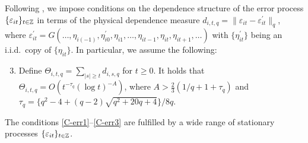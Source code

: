 \documentclass[a4paper,12pt]{article}
\begin{document}
Following \cite{Wu2005}, we impose conditions on the dependence structure of the error process $\{\varepsilon_{it}\}_{t\in\mathbb{Z}}$ in terms of the physical dependence measure $d_{i, t,q} = \| \varepsilon_{it} - \varepsilon_{it}^\prime \|_q$, where $\varepsilon_{it}^\prime = G(\ldots,\eta_{i(-1)},\eta_{i0}^\prime,\eta_{i1},\ldots,\eta_{it-1},\eta_{it},\eta_{it+1},\ldots)$ with $\{\eta_{it}^\prime\}$ being an i.i.d.\ copy of $\{\eta_{it}\}$. In particular, we assume the following: 
\begin{enumerate}[label=(C\arabic*),leftmargin=1.05cm]
\setcounter{enumi}{2}

\item \label{C-err3} Define $\Theta_{i, t,q} = \sum\nolimits_{|s| \ge t} d_{i, s,q}$ for $t \ge 0$. It holds that 
$\Theta_{i, t,q} = O ( t^{-\tau_q} (\log t)^{-A} )$,  
where $A > \frac{2}{3} (1/q + 1 + \tau_q)$ and $\tau_q = \{q^2 - 4 + (q-2) \sqrt{q^2 + 20q + 4}\} / 8q$. 

\end{enumerate}
The conditions \ref{C-err1}--\ref{C-err3} are fulfilled by a wide range of stationary processes $\{\varepsilon_{it}\}_{t\in\mathbb{Z}}$.%
\end{document}

